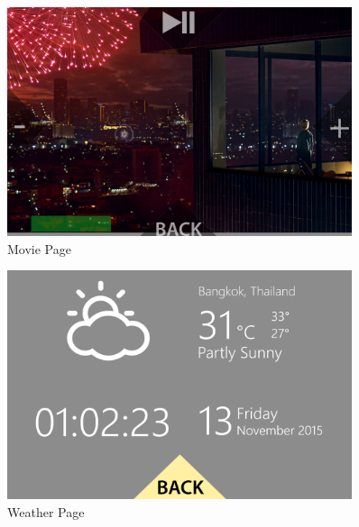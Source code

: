\begin{figure}[H]
	\centering
	\includegraphics[width=0.9\textwidth]{chapter6/pagemovie.png}
	\caption{Movie Page}
	\label{fig:movie}
\end{figure}
\begin{figure}[H]
	\centering
	\includegraphics[width=0.9\textwidth]{chapter6/pageweather.png}
	\caption{Weather Page}
	\label{fig:weather}
\end{figure}

